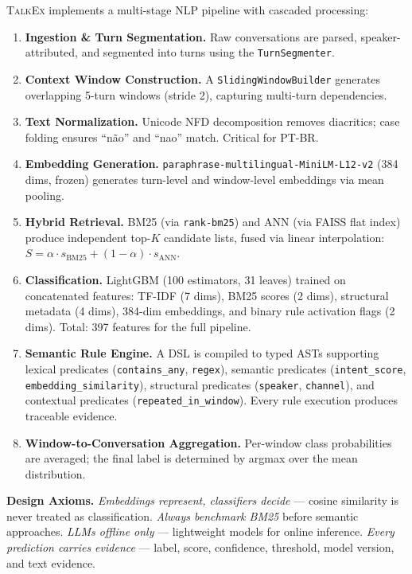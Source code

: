 \documentclass[11pt]{article}
\newcommand{\talkex}{\textsc{TalkEx}}
\begin{document}
\talkex{} implements a multi-stage NLP pipeline with cascaded processing:

\begin{enumerate}[leftmargin=*,itemsep=2pt]
    \item \textbf{Ingestion \& Turn Segmentation.} Raw conversations are parsed, speaker-attributed, and segmented into turns using the \texttt{TurnSegmenter}.
    \item \textbf{Context Window Construction.} A \texttt{SlidingWindowBuilder} generates overlapping 5-turn windows (stride 2), capturing multi-turn dependencies.
    \item \textbf{Text Normalization.} Unicode NFD decomposition removes diacritics; case folding ensures ``n\~{a}o'' and ``nao'' match. Critical for PT-BR.
    \item \textbf{Embedding Generation.} \texttt{paraphrase-multilingual-MiniLM-L12-v2} (384 dims, frozen) generates turn-level and window-level embeddings via mean pooling.
    \item \textbf{Hybrid Retrieval.} BM25 (via \texttt{rank-bm25}) and ANN (via FAISS flat index) produce independent top-$K$ candidate lists, fused via linear interpolation: $S = \alpha \cdot s_{\text{BM25}} + (1-\alpha) \cdot s_{\text{ANN}}$.
    \item \textbf{Classification.} LightGBM (100 estimators, 31 leaves) trained on concatenated features: TF-IDF (7 dims), BM25 scores (2 dims), structural metadata (4 dims), 384-dim embeddings, and binary rule activation flags (2 dims). Total: 397 features for the full pipeline.
    \item \textbf{Semantic Rule Engine.} A DSL is compiled to typed ASTs supporting lexical predicates (\texttt{contains\_any}, \texttt{regex}), semantic predicates (\texttt{intent\_score}, \texttt{embedding\_similarity}), structural predicates (\texttt{speaker}, \texttt{channel}), and contextual predicates (\texttt{repeated\_in\_window}). Every rule execution produces traceable evidence.
    \item \textbf{Window-to-Conversation Aggregation.} Per-window class probabilities are averaged; the final label is determined by argmax over the mean distribution.
\end{enumerate}

\noindent\textbf{Design Axioms.} \emph{Embeddings represent, classifiers decide} --- cosine similarity is never treated as classification. \emph{Always benchmark BM25} before semantic approaches. \emph{LLMs offline only} --- lightweight models for online inference. \emph{Every prediction carries evidence} --- label, score, confidence, threshold, model version, and text evidence.
\end{document}
